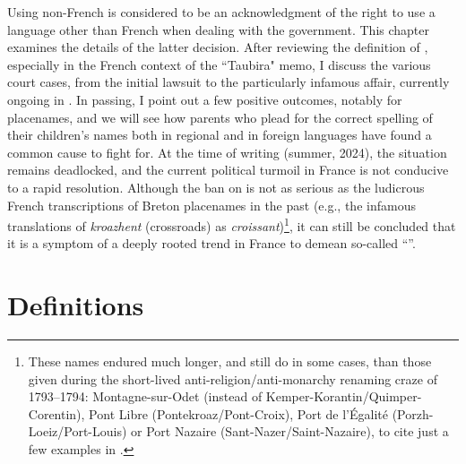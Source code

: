 \documentclass[output=paper,colorlinks,citecolor=brown]{langscibook}
\begin{document}
Using non-French  is considered to be an acknowledgment of the right to use a language other than French when dealing with the government. This chapter examines the details of the latter decision. After reviewing the definition of , especially in the French context of the “Taubira" memo, I discuss the various court cases, from the initial  lawsuit to the particularly infamous  affair, currently ongoing in . In passing, I point out a few positive outcomes, notably for placenames, and we will see how parents who plead for the correct spelling of their children’s names both in regional and in foreign languages have found a common cause to fight for. At the time of writing (summer, 2024), the situation remains deadlocked, and the current political turmoil in France is not conducive to a rapid resolution. Although the ban on  is not as serious as the ludicrous French transcriptions of Breton placenames in the past (e.g., the infamous translations of \textit{kroazhent} (crossroads) as \textit{croissant})\footnote{These names endured much longer, and still do in some cases, than those given during the short-lived anti-religion/anti-monarchy renaming craze of 1793--1794: Montagne-sur-Odet (instead of Kemper-Korantin/Quimper-Corentin), Pont Libre (Pontekroaz/Pont-Croix), Port de l’Égalité (Porzh-Loeiz/Port-Louis) or Port Nazaire (Sant-Nazer/Saint-Nazaire), to cite just a few examples in .}, it can still be concluded that it is a symptom of a deeply rooted trend in France to demean so-called “”.

\section{Definitions}
\end{document}

